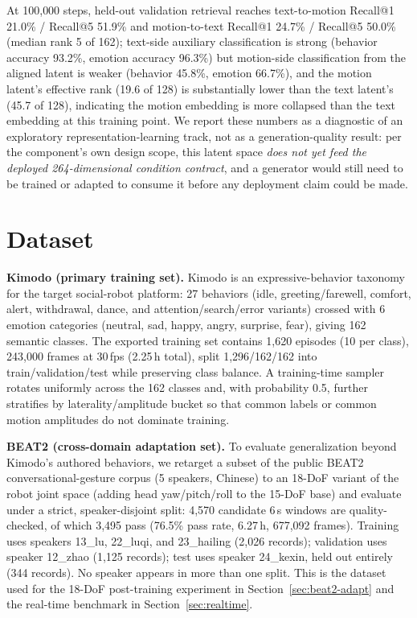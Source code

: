 \documentclass[conference]{IEEEtran}
\begin{document}
At 100{,}000 steps, held-out validation retrieval reaches
text-to-motion Recall@1 21.0\% / Recall@5 51.9\% and motion-to-text
Recall@1 24.7\% / Recall@5 50.0\% (median rank 5 of 162); text-side
auxiliary classification is strong (behavior accuracy 93.2\%, emotion
accuracy 96.3\%) but motion-side classification from the aligned latent
is weaker (behavior 45.8\%, emotion 66.7\%), and the motion latent's
effective rank (19.6 of 128) is substantially lower than the text
latent's (45.7 of 128), indicating the motion embedding is more
collapsed than the text embedding at this training point. We report
these numbers as a diagnostic of an exploratory representation-learning
track, not as a generation-quality result: per the component's own
design scope, this latent space \emph{does not yet feed the deployed
264-dimensional condition contract}, and a generator would still need
to be trained or adapted to consume it before any deployment claim
could be made.

\section{Dataset}
\label{sec:dataset}

\textbf{Kimodo (primary training set).} Kimodo is an expressive-behavior
taxonomy for the target social-robot platform: 27 behaviors (idle,
greeting/farewell, comfort, alert, withdrawal, dance, and
attention/search/error variants) crossed with 6 emotion categories
(neutral, sad, happy, angry, surprise, fear), giving 162 semantic
classes. The exported training set contains 1{,}620 episodes
(10 per class), 243{,}000 frames at 30\,fps (2.25\,h total), split
1{,}296/162/162 into train/validation/test while preserving class
balance. A training-time sampler rotates uniformly across the 162
classes and, with probability 0.5, further stratifies by
laterality/amplitude bucket so that common labels or common motion
amplitudes do not dominate training.

\textbf{BEAT2 (cross-domain adaptation set).} To evaluate generalization
beyond Kimodo's authored behaviors, we retarget a subset of the public
BEAT2 conversational-gesture corpus \cite{beat2} (5 speakers, Chinese)
to an 18-DoF variant of the robot joint space (adding head yaw/pitch/roll
to the 15-DoF base) and evaluate under a strict, speaker-disjoint split:
4{,}570 candidate 6\,s windows are quality-checked, of which 3{,}495
pass (76.5\% pass rate, 6.27\,h, 677{,}092 frames). Training uses
speakers 13\_lu, 22\_luqi, and 23\_hailing (2{,}026 records); validation
uses speaker 12\_zhao (1{,}125 records); test uses speaker 24\_kexin,
held out entirely (344 records). No speaker appears in more than one
split. This is the dataset used for the 18-DoF post-training experiment
in Section~\ref{sec:beat2-adapt} and the real-time benchmark in
Section~\ref{sec:realtime}.
\end{document}
